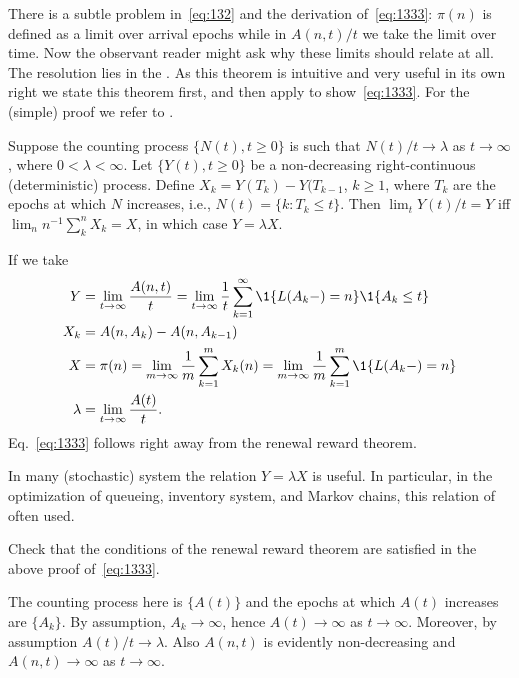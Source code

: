 There is a subtle problem in~\eqref{eq:132} and the derivation
of~\eqref{eq:1333}: $\pi(n)$ is defined as a limit over arrival epochs
while in $A(n,t)/t$ we take the limit over time. Now the observant
reader might ask why these limits should relate at all.  The
resolution lies in the . As this
theorem is intuitive and very useful in its own right we state this
theorem first, and then apply to show~\eqref{eq:1333}. For the (simple) proof we refer to \citet{el-taha98:_sampl_path_analy_queuein_system}.

\begin{theorem}[Renewal Reward Theorem, $Y=\lambda X$]
  Suppose the counting process $\{N(t), t\geq 0\}$ is such that
  $N(t)/t\to\lambda$ as $t\to\infty$, where $0<\lambda < \infty$. Let
  $\{Y(t), t\geq 0\}$ be a non-decreasing right-continuous
  (deterministic) process. Define $X_k = Y(T_k)-Y(T_{k-1}$, $k\geq 1$,
  where $T_k$ are the epochs at which $N$ increases, i.e.,
  $N(t) = \{k : T_k \leq t\}$. Then $\lim_t Y(t)/t=Y$ iff
  $\lim_n n^{-1}\sum_k^n X_k =X$, in which case $Y=\lambda X$.
\end{theorem}

If we take 
\begin{align*}
  Y &= \lim_{t\to\infty} \frac{A(n,t)}{t} = \lim_{t\to\infty} \frac 1 t \sum_{k=1}^\infty \1{L(A_k-) = n}\1{A_k\leq t} \\
X_k &= A(n, A_k) - A(n, A_{k-1}) \\
X &= \pi(n) = \lim_{m\to\infty} \frac 1 m \sum_{k=1}^m X_k(n) =\lim_{m\to\infty} \frac 1 m \sum_{k=1}^m \1{L(A_k-)=n} \\
\lambda &= \lim_{t\to\infty}\frac{A(t)}t.
\end{align*}
Eq.~\eqref{eq:1333} follows right away from the renewal reward theorem.

In many (stochastic) system the relation $Y=\lambda X$ is useful. In
particular, in the optimization of queueing, inventory system, and
Markov chains, this relation of often used.

\begin{question} 
Check that the conditions of the renewal reward theorem are satisfied in the above proof of~\eqref{eq:1333}. 
  \begin{solution}
    The counting process here is $\{A(t)\}$ and the epochs at which
    $A(t)$ increases are $\{A_k\}$. By assumption, $A_k\to\infty$,
    hence $A(t)\to\infty$ as $t\to\infty$. Moreover, by assumption
    $A(t)/t \to \lambda$. Also $A(n,t)$ is evidently non-decreasing and
    $A(n,t)\to\infty$ as $t\to\infty$.
  \end{solution}
\end{question}

